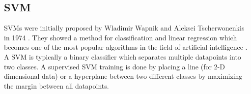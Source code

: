 \subsection{\acf{SVM}}
\label{sec:svm}

\acfp{SVM} were initially proposed by Wladimir Wapnik and Aleksei Tscherwonenkis in 1974 \cite{vapnik1974theory}. They showed a method for classification and linear regression which becomes one of the most popular algorithms in the field of artificial intelligence \cite{russellnorvig-ai}. A \ac{SVM} is typically a binary classifier which separates multiple datapoints into two classes. A supervised \ac{SVM} training is done by placing a line (for 2-D dimensional data) or a hyperplane between two different classes by maximizing the margin between all datapoints. 
